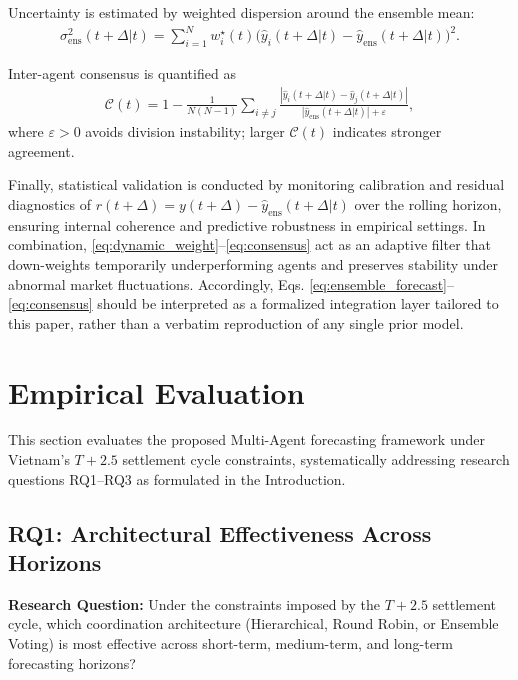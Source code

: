 \documentclass{ieeeaccess}
\begin{document}
Uncertainty is estimated by weighted dispersion around the ensemble mean:
\begin{align}
\sigma_{\text{ens}}^{2}(t+\Delta|t)=
\sum_{i=1}^{N}w_i^{\star}(t)\Big(\hat y_i(t+\Delta|t)-\hat y_{\text{ens}}(t+\Delta|t)\Big)^2.
\label{eq:ensemble_variance}
\end{align}

Inter-agent consensus is quantified as
\begin{align}
\mathcal{C}(t)=1-\frac{1}{N(N-1)}\!\sum_{i\neq j}
\frac{\left|\hat y_i(t+\Delta|t)-\hat y_j(t+\Delta|t)\right|}
{\left|\hat y_{\text{ens}}(t+\Delta|t)\right|+\varepsilon},
\label{eq:consensus}
\end{align}
where $\varepsilon>0$ avoids division instability; larger $\mathcal{C}(t)$ indicates stronger agreement.

Finally, statistical validation is conducted by monitoring calibration and residual diagnostics of $r(t+\Delta)=y(t+\Delta)-\hat y_{\text{ens}}(t+\Delta|t)$ over the rolling horizon, ensuring internal coherence and predictive robustness in empirical settings\cite{wang2021,li2022}. In combination, \eqref{eq:dynamic_weight}--\eqref{eq:consensus} act as an adaptive filter that down-weights temporarily underperforming agents and preserves stability under abnormal market fluctuations.
Accordingly, Eqs. \eqref{eq:ensemble_forecast}--\eqref{eq:consensus} should be interpreted as a formalized integration layer tailored to this paper, rather than a verbatim reproduction of any single prior model\cite{wang2021,li2022}.






\section{Empirical Evaluation}

This section evaluates the proposed Multi-Agent forecasting framework under Vietnam's $T+2.5$ settlement cycle constraints, systematically addressing research questions RQ1–RQ3 as formulated in the Introduction.

\subsection{RQ1: Architectural Effectiveness Across Horizons}

\textbf{Research Question:} Under the constraints imposed by the $T+2.5$ settlement cycle, which coordination architecture (Hierarchical, Round Robin, or Ensemble Voting) is most effective across short-term, medium-term, and long-term forecasting horizons?
\end{document}
